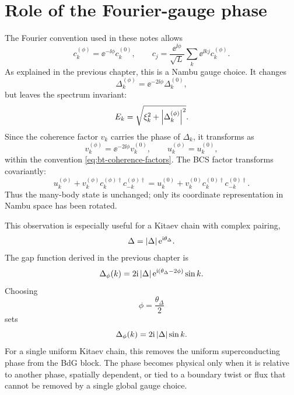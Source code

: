 \section{Role of the Fourier-gauge phase}
\label{sec:bt-fourier-gauge-phase}

The Fourier convention used in these notes allows
\begin{equation}
\label{eq:bt-fourier-phase-convention}
    c_k^{(\phi)}=\ee^{-\ii\phi}c_k^{(0)},
    \qquad
    c_j=\frac{\ee^{\ii\phi}}{\sqrt{L}}
    \sum_k \ee^{\ii kj}c_k^{(\phi)}.
\end{equation}
As explained in the previous chapter, this is a Nambu gauge choice.  It changes
\begin{equation}
\label{eq:bt-gap-phase-under-fourier-gauge}
    \Delta_k^{(\phi)}=\ee^{-2\ii\phi}\Delta_k^{(0)},
\end{equation}
but leaves the spectrum invariant:
\begin{equation}
    E_k=\sqrt{\xi_k^2+\left|\Delta_k^{(\phi)}\right|^2}.
\end{equation}
Since the coherence factor $v_k$ carries the phase of $\Delta_k$, it transforms
as
\begin{equation}
\label{eq:bt-v-gauge-transformation}
    v_k^{(\phi)}=\ee^{-2\ii\phi}v_k^{(0)},
    \qquad
    u_k^{(\phi)}=u_k^{(0)},
\end{equation}
within the convention \cref{eq:bt-coherence-factors}.  The BCS factor transforms
covariantly:
\begin{equation}
\label{eq:bt-bcs-factor-gauge-invariance}
    u_k^{(\phi)}+v_k^{(\phi)}
    c_k^{(\phi)\dagger}c_{-k}^{(\phi)\dagger}
    =
    u_k^{(0)}+v_k^{(0)}c_k^{(0)\dagger}c_{-k}^{(0)\dagger}.
\end{equation}
Thus the many-body state is unchanged; only its coordinate representation in
Nambu space has been rotated.

This observation is especially useful for a Kitaev chain with complex pairing,
\begin{equation}
\label{eq:bt-complex-kitaev-gap}
    \Delta=\left|\Delta\right|\mathrm{e}^{\mathrm{i}\theta_\Delta}.
\end{equation}
The gap function derived in the previous chapter is
\begin{equation}
\label{eq:bt-kitaev-gap-with-phase}
    \Delta_\phi(k)
    =
    2\mathrm{i}\left|\Delta\right|\mathrm{e}^{\mathrm{i}(\theta_\Delta-2\phi)}\sin k.
\end{equation}
Choosing
\begin{equation}
\label{eq:bt-kitaev-phase-gauge-choice}
    \phi=\frac{\theta_\Delta}{2}
\end{equation}
sets
\begin{equation}
    \Delta_\phi(k)=2\mathrm{i}\left|\Delta\right|\sin k.
\end{equation}
For a single uniform Kitaev chain, this removes the uniform superconducting phase
from the BdG block.  The phase becomes physical only when it is relative to
another phase, spatially dependent, or tied to a boundary twist or flux that
cannot be removed by a single global gauge choice.

